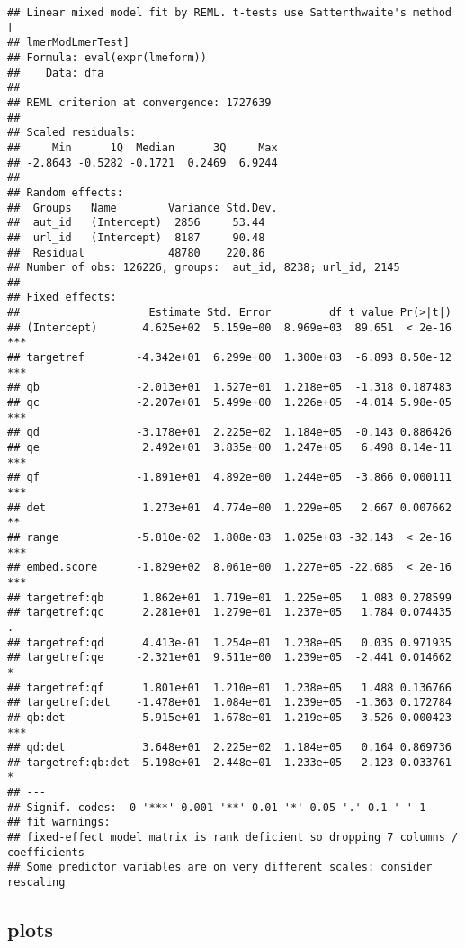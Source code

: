 \documentclass[
  12pt,
  oneside]{book}
\begin{document}
\begin{verbatim}
## Linear mixed model fit by REML. t-tests use Satterthwaite's method [
## lmerModLmerTest]
## Formula: eval(expr(lmeform))
##    Data: dfa
## 
## REML criterion at convergence: 1727639
## 
## Scaled residuals: 
##     Min      1Q  Median      3Q     Max 
## -2.8643 -0.5282 -0.1721  0.2469  6.9244 
## 
## Random effects:
##  Groups   Name        Variance Std.Dev.
##  aut_id   (Intercept)  2856     53.44  
##  url_id   (Intercept)  8187     90.48  
##  Residual             48780    220.86  
## Number of obs: 126226, groups:  aut_id, 8238; url_id, 2145
## 
## Fixed effects:
##                    Estimate Std. Error         df t value Pr(>|t|)    
## (Intercept)       4.625e+02  5.159e+00  8.969e+03  89.651  < 2e-16 ***
## targetref        -4.342e+01  6.299e+00  1.300e+03  -6.893 8.50e-12 ***
## qb               -2.013e+01  1.527e+01  1.218e+05  -1.318 0.187483    
## qc               -2.207e+01  5.499e+00  1.226e+05  -4.014 5.98e-05 ***
## qd               -3.178e+01  2.225e+02  1.184e+05  -0.143 0.886426    
## qe                2.492e+01  3.835e+00  1.247e+05   6.498 8.14e-11 ***
## qf               -1.891e+01  4.892e+00  1.244e+05  -3.866 0.000111 ***
## det               1.273e+01  4.774e+00  1.229e+05   2.667 0.007662 ** 
## range            -5.810e-02  1.808e-03  1.025e+03 -32.143  < 2e-16 ***
## embed.score      -1.829e+02  8.061e+00  1.227e+05 -22.685  < 2e-16 ***
## targetref:qb      1.862e+01  1.719e+01  1.225e+05   1.083 0.278599    
## targetref:qc      2.281e+01  1.279e+01  1.237e+05   1.784 0.074435 .  
## targetref:qd      4.413e-01  1.254e+01  1.238e+05   0.035 0.971935    
## targetref:qe     -2.321e+01  9.511e+00  1.239e+05  -2.441 0.014662 *  
## targetref:qf      1.801e+01  1.210e+01  1.238e+05   1.488 0.136766    
## targetref:det    -1.478e+01  1.084e+01  1.239e+05  -1.363 0.172784    
## qb:det            5.915e+01  1.678e+01  1.219e+05   3.526 0.000423 ***
## qd:det            3.648e+01  2.225e+02  1.184e+05   0.164 0.869736    
## targetref:qb:det -5.198e+01  2.448e+01  1.233e+05  -2.123 0.033761 *  
## ---
## Signif. codes:  0 '***' 0.001 '**' 0.01 '*' 0.05 '.' 0.1 ' ' 1
## fit warnings:
## fixed-effect model matrix is rank deficient so dropping 7 columns / coefficients
## Some predictor variables are on very different scales: consider rescaling
\end{verbatim}

\subsection{plots}\label{plots}
\end{document}
